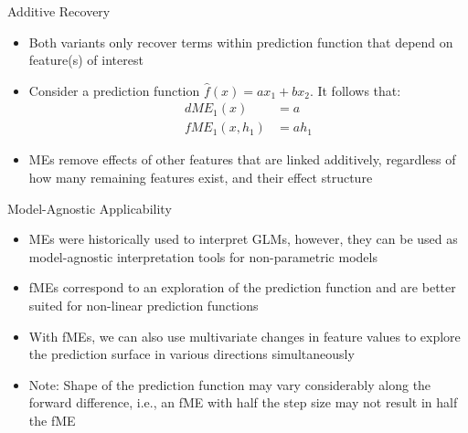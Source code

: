 \documentclass[11pt,compress,t,notes=noshow, aspectratio=169, xcolor=table]{beamer}
\begin{document}

\begin{frame}{Additive Recovery}

\begin{itemize}
\itemsep1em
\item Both variants only recover terms within prediction function that depend on feature(s) of interest
\item Consider a prediction function $\widehat{f}(x) = ax_1 + bx_2$. It follows that:
\begin{align*}
dME_1(x) &= a \\
fME_1(x, h_1) &= ah_1
\end{align*}
\item MEs remove effects of other features that are linked additively, regardless of how many remaining features exist, and their effect structure
\end{itemize}

\end{frame}


\begin{frame}{Model-Agnostic Applicability}

\begin{itemize}
\itemsep1em
\item MEs were historically used to interpret GLMs, however, they can be used as model-agnostic interpretation tools for non-parametric models 
\item fMEs correspond to an exploration of the prediction function and are better suited for non-linear prediction functions
\item With fMEs, we can also use multivariate changes in feature values to explore the prediction surface in various directions simultaneously
\item Note: Shape of the prediction function may vary considerably along the forward difference, i.e., an fME with half the step size may not result in half the fME
\end{itemize}

\end{frame}
\end{document}
